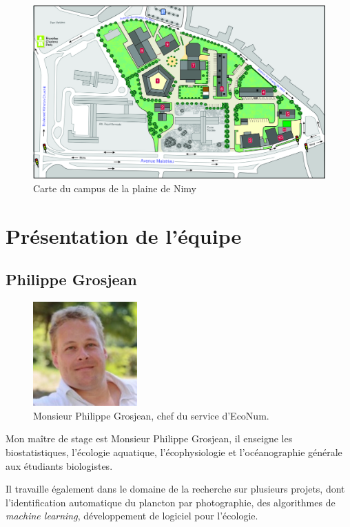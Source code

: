\documentclass[]{article}
\begin{document}
\begin{figure}
\centering
\includegraphics{../image/plaine-Nimy.jpg}
\caption{Carte du campus de la plaine de Nimy}
\end{figure}

\section{Présentation de l'équipe}\label{presentation-de-lequipe}

\subsection{Philippe Grosjean}\label{philippe-grosjean}

\begin{figure}[h!]
\includegraphics[width=4cm]{../image/Grosjean2.jpg}
\caption{Monsieur Philippe Grosjean, chef du service d'EcoNum.}
\end{figure}

Mon maître de stage est Monsieur Philippe Grosjean, il enseigne les
biostatistiques, l'écologie aquatique, l'écophysiologie et
l'océanographie générale aux étudiants biologistes.

Il travaille également dans le domaine de la recherche sur plusieurs
projets, dont l'identification automatique du plancton par photographie,
des algorithmes de \emph{machine learning}, développement de logiciel
pour l'écologie.
\end{document}
